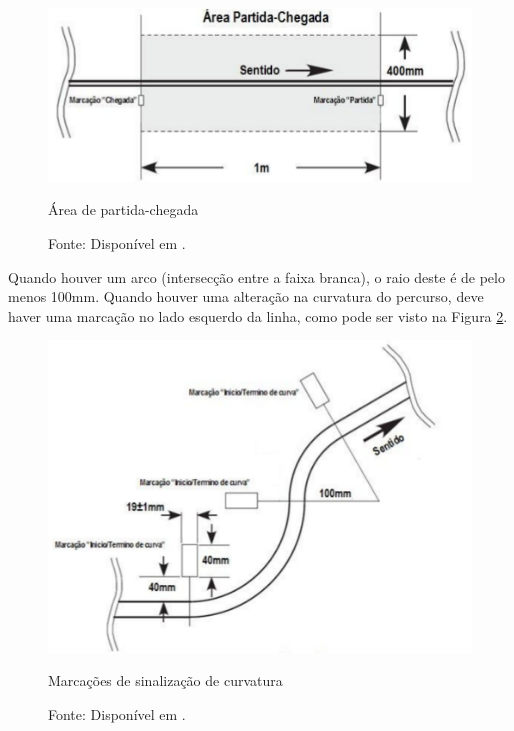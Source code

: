 \vspace{0.6cm}
\begin{figure}[h!]
 \centering
 \captionsetup{width=0.55\textwidth,font=footnotesize,textfont=bf}
 \includegraphics[scale=0.5]{figuras/Percurso2.png}
 \caption{Área de partida-chegada \label{fig:percurso2}}
  \vspace{-0.3cm}
 \caption*{Fonte: Disponível em \cite[p.4]{RegrasRobocore}.}
\end{figure}



Quando houver um arco (intersecção entre a faixa branca), o raio deste é de pelo menos 100mm. Quando houver uma 
alteração na curvatura do percurso, deve haver uma marcação no lado esquerdo da linha, como pode ser visto na Figura 
\ref{fig:percurso4}.\par

\begin{figure}[t!]
 \centering
 \captionsetup{width=0.68\textwidth,font=footnotesize,textfont=bf}
 \includegraphics[scale=0.6]{figuras/Percurso4.png}
 \caption{Marcações de sinalização de curvatura \label{fig:percurso4}}
 \vspace{-0.3cm}
 \caption*{Fonte: Disponível em \cite[p.4]{RegrasRobocore}.}
\end{figure}


















